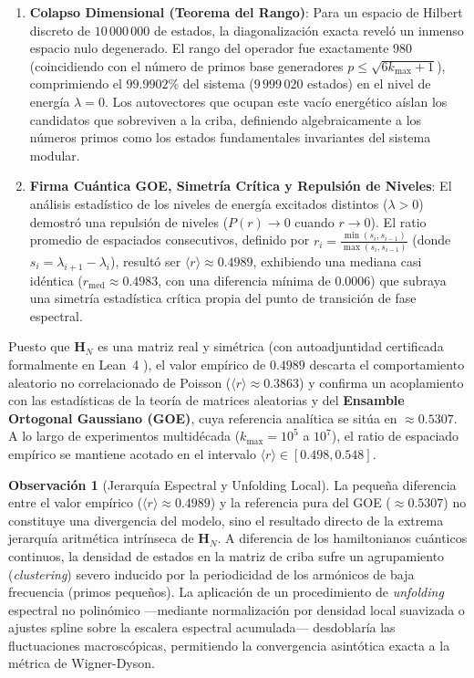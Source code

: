 \documentclass{article}
\numberwithin{equation}{section}
\theoremstyle{plain}
\theoremstyle{definition}
\newtheorem{remark}[theorem]{Observación}
\begin{document}
\begin{enumerate}
    \item \textbf{Colapso Dimensional (Teorema del Rango)}: Para un espacio de Hilbert discreto de $10\,000\,000$ de estados, la diagonalización exacta reveló un inmenso espacio nulo degenerado. El rango del operador fue exactamente $980$ (coincidiendo con el número de primos base generadores $p \le \sqrt{6k_{\max}+1}$), comprimiendo el $99.9902\%$ del sistema ($9\,999\,020$ estados) en el nivel de energía $\lambda = 0$. Los autovectores que ocupan este vacío energético aíslan los candidatos que sobreviven a la criba, definiendo algebraicamente a los números primos como los estados fundamentales invariantes del sistema modular.
    
    \item \textbf{Firma Cuántica GOE, Simetría Crítica y Repulsión de Niveles}: El análisis estadístico de los niveles de energía excitados distintos ($\lambda > 0$) demostró una repulsión de niveles ($P(r) \to 0$ cuando $r \to 0$). El ratio promedio de espaciados consecutivos, definido por $r_i = \frac{\min(s_i, s_{i-1})}{\max(s_i, s_{i-1})}$ (donde $s_i = \lambda_{i+1} - \lambda_i$), resultó ser $\langle r \rangle \approx 0.4989$, exhibiendo una mediana casi idéntica ($r_{\text{med}} \approx 0.4983$, con una diferencia mínima de $0.0006$) que subraya una simetría estadística crítica propia del punto de transición de fase espectral.
\end{enumerate}

Puesto que $\mathbf{H}_N$ es una matriz real y simétrica (con autoadjuntidad certificada formalmente en Lean~4 \cite{Lean4}), el valor empírico de $0.4989$ descarta el comportamiento aleatorio no correlacionado de Poisson ($\langle r \rangle \approx 0.3863$) y confirma un acoplamiento con las estadísticas de la teoría de matrices aleatorias \cite{Mehta2004} y del \textbf{Ensamble Ortogonal Gaussiano (GOE)}, cuya referencia analítica se sitúa en $\approx 0.5307$. A lo largo de experimentos multidécada ($k_{\max} = 10^5$ a $10^7$), el ratio de espaciado empírico se mantiene acotado en el intervalo $\langle r \rangle \in [0.498, 0.548]$.

\begin{remark}[Jerarquía Espectral y Unfolding Local]
\label{rem:unfolding-espectral}
La pequeña diferencia entre el valor empírico ($\langle r \rangle \approx 0.4989$) y la referencia pura del GOE ($\approx 0.5307$) no constituye una divergencia del modelo, sino el resultado directo de la extrema jerarquía aritmética intrínseca de $\mathbf{H}_N$. A diferencia de los hamiltonianos cuánticos continuos, la densidad de estados en la matriz de criba sufre un agrupamiento (\textit{clustering}) severo inducido por la periodicidad de los armónicos de baja frecuencia (primos pequeños). La aplicación de un procedimiento de \textit{unfolding} espectral no polinómico —mediante normalización por densidad local suavizada o ajustes spline sobre la escalera espectral acumulada— desdoblaría las fluctuaciones macroscópicas, permitiendo la convergencia asintótica exacta a la métrica de Wigner-Dyson.
\end{remark}
\end{document}
